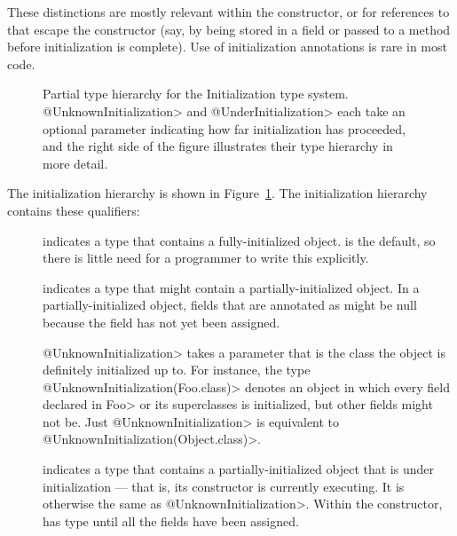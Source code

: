 These distinctions are mostly relevant within the constructor, or for
references to  that escape the constructor (say, by being stored
in a field or passed to a method before initialization is complete).
Use of initialization annotations is rare in most code.



\begin{figure}
\caption{Partial type hierarchy for the Initialization type system.
  \<@UnknownInitialization> and \<@UnderInitialization> each take an
  optional parameter indicating how far initialization has proceeded, and
  the right side of the figure illustrates their type hierarchy in more detail.}
\label{fig-initialization-hierarchy}
\end{figure}

The initialization hierarchy is shown in Figure~\ref{fig-initialization-hierarchy}.
The initialization hierarchy contains these qualifiers:

\begin{description}

\item[]
  indicates a type that contains a fully-initialized object.  
  is the default, so there is little need for a programmer to write this
  explicitly.

\item[]
  indicates a type that might contain a partially-initialized object.  In a
  partially-initialized object, fields that are annotated as
   might be null because the field
  has not yet been assigned.

  \<@UnknownInitialization> takes a parameter that is the class the object
  is definitely initialized up to.  For instance, the type
  \<@UnknownInitialization(Foo.class)> denotes an object in which every
  field declared in \<Foo> or its superclasses is initialized, but other
  fields might not be.
  Just \<@UnknownInitialization> is equivalent to
  \<@UnknownInitialization(Object.class)>.

\item[]
  indicates a type that contains a partially-initialized object that is
  under initialization --- that is, its constructor is currently executing.
  It is otherwise the same as \<@UnknownInitialization>.  Within the
  constructor,  has
   type until
  all the  fields have been assigned.

\end{description}

